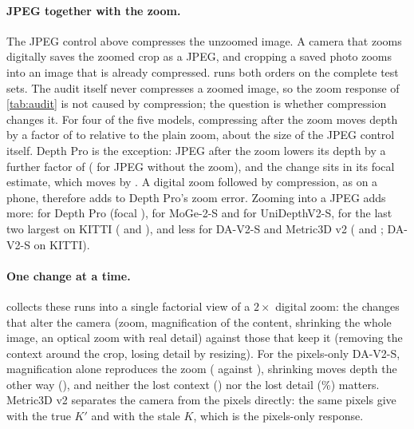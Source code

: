 \documentclass[10pt,twocolumn,letterpaper]{article}
\begin{document}
\paragraph{JPEG together with the zoom.} The JPEG control above compresses the unzoomed image. A camera that zooms
digitally saves the zoomed crop as a JPEG, and cropping a saved photo zooms into an image that is already
compressed.  runs both orders on the complete test sets. The audit itself never compresses a
zoomed image, so the zoom response of \cref{tab:audit} is not caused by compression; the question is whether
compression changes it. For four of the five models, compressing after the zoom moves depth by a factor of
\DavTwoSJpegAfterZoom{} to \MogeTwoSJpegAfterZoom{} relative to the plain zoom, about the size of the JPEG control
itself. Depth Pro is the exception: JPEG after the zoom lowers its depth by a further factor of
\DepthproJpegAfterZoom{} (\DepthproJzJpegOne{} for JPEG without the zoom), and the change sits in its focal
estimate, which moves by \DepthproJpegAfterZoomFocal. A digital zoom followed by compression, as on a phone,
therefore adds to Depth Pro's zoom error. Zooming into a JPEG adds more: \DepthproZoomOfJpeg{} for Depth Pro
(focal \DepthproZoomOfJpegFocal), \MogeTwoSZoomOfJpeg{} for MoGe-2-S and \UnidepthTwoSZoomOfJpeg{} for
UniDepthV2-S, for the last two largest on KITTI (\MogeTwoSZoomOfJpegKitti{} and \UnidepthTwoSZoomOfJpegKitti),
and less for DA-V2-S and Metric3D v2 (\DavTwoSZoomOfJpeg{} and \MetricThreedSZoomOfJpeg; DA-V2-S
\DavTwoSZoomOfJpegKitti{} on KITTI).



\paragraph{One change at a time.}  collects these runs into a single factorial view of a
$2\times$ digital zoom: the changes that alter the camera (zoom, magnification of the content, shrinking the whole
image, an optical zoom with real detail) against those that keep it (removing the context around the crop,
losing detail by resizing). For the pixels-only DA-V2-S, magnification alone reproduces the zoom
(\DavTwoSCueMagnify{} against \DavTwoSZoomTwoFactor), shrinking moves depth the other way (\DavTwoSCueShrink), and
neither the lost context (\DavTwoSCueContext) nor the lost detail (\DavTwoSBlur\%) matters. Metric3D v2 separates
the camera from the pixels directly: the same pixels give \MetricThreedSZoomTwoFactor{} with the true $K'$ and
\MetricThreedSStaleKZoomTwoFactor{} with the stale $K$, which is the pixels-only response.
\end{document}
